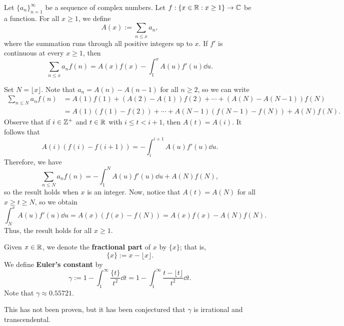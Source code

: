 \begin{lemma}\label{lemma:2.8}
Let $\{a_n\}_{n=1}^\infty$ be a sequence of complex numbers. 
Let $f : \{x \in \mathbb{R} : x \geq 1\} \to \mathbb{C}$ be a function. 
For all $x \geq 1$, we define 
\[ A(x) := \sum_{n\leq x} a_n, \]
where the summation runs through all positive integers up to 
$x$. If $f'$ is continuous at every $x \geq 1$, then 
\[ \sum_{n\leq x} a_n f(n) = A(x) f(x) - \int_1^x A(u)f'(u)\dd u. \]
\end{lemma}
\begin{pf}
Set $N = \lfloor x \rfloor$. Note that 
$a_n = A(n) - A(n-1)$ for all $n \geq 2$, so we can write 
\begin{align*}
    \sum_{n\leq N} a_n f(n) &= A(1)f(1) + 
    (A(2) - A(1))f(2) + \cdots + (A(N) - A(N-1)) f(N) \\
    &= A(1)(f(1) - f(2)) + \cdots + A(N-1)(f(N-1) - f(N)) + A(N)f(N).
\end{align*}
Observe that if $i \in \mathbb{Z}^+$ and $t \in \mathbb{R}$ with $i \leq t < i+1$, then $A(t) = A(i)$. 
It follows that 
\[ A(i) (f(i) - f(i+1)) = -\int_i^{i+1} A(u) f'(u)\dd u. \]
Therefore, we have 
\[ \sum_{n\leq N} a_n f(n) = -\int_1^N A(u)f'(u)\dd u + 
A(N)f(N), \]
so the result holds when $x$ is an integer. Now, notice that 
$A(t) = A(N)$ for all $x \geq t \geq N$, so we obtain 
\[ \int_N^x A(u) f'(u)\dd u = A(x)(f(x) - f(N)) = 
A(x)f(x) - A(N)f(N). \]
Thus, the result holds for all $x \geq 1$.
\end{pf}

\begin{defn}\label{def:2.9}
Given $x \in \mathbb{R}$, we denote the {\bf fractional part} of 
$x$ by $\{x\}$; that is, 
\[ \{x\} := x - \lfloor x \rfloor. \]
We define {\bf Euler's constant} by 
\[ \gamma := 1 - \int_1^\infty \frac{\{t\}}{t^2}\dd t 
= 1 - \int_1^\infty \frac{t - \lfloor t \rfloor}{t^2}\dd t. \]
Note that $\gamma \approx 0.55721$. 
\end{defn}

This has not been proven, but it has been conjectured that 
$\gamma$ is irrational and transcendental.

